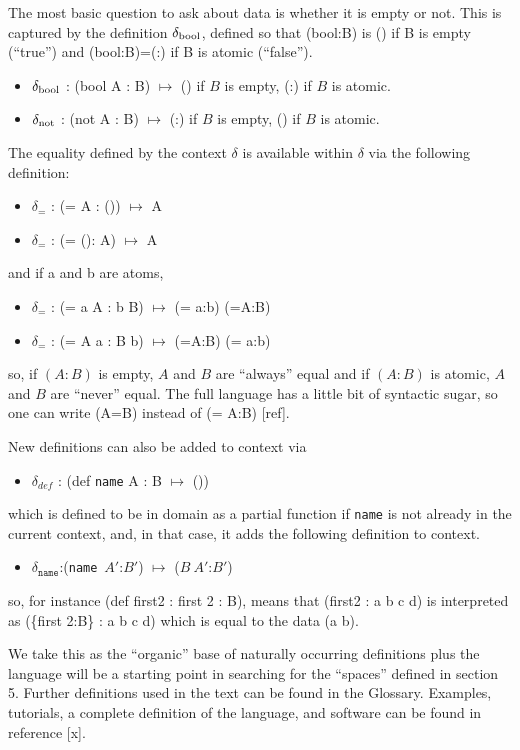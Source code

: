 \documentclass[11pt]{article}
\begin{document}
    The most basic question to ask about data is whether it is empty or not.  This is captured by the definition $\delta_{\rm bool}$, defined 
so that (bool:B) is () if B is empty (``true'') and (bool:B)=(:) if B is atomic (``false'').
\begin{itemize}
\item {$\delta_{\rm bool}$ : ({\rm bool} A : B) $\mapsto$ () if $B$ is empty, (:) if $B$ is atomic.}
\item {$\delta_{\rm not}$ : ({\rm not} A : B) $\mapsto$ (:) if $B$ is empty, () if $B$ is atomic.} 
\end{itemize} 
The equality defined by the context $\delta$ is available within $\delta$ via the following definition:
\begin{itemize}
\item {$\delta_{=}$ : (= A : ()) $\mapsto$ A}
\item {$\delta_{=}$ : (= (): A) $\mapsto$ A}
\end{itemize}
and if a and b are atoms, 
\begin{itemize}
\item {$\delta_{=}$ : (= a A : b B) $\mapsto$ (= a:b) (=A:B)}
\item {$\delta_{=}$ : (= A a : B b) $\mapsto$ (=A:B) (= a:b)}
\end{itemize}
so, if $(A:B)$ is empty, $A$ and $B$ are ``always'' equal and if $(A:B)$ is atomic, $A$ and $B$ are ``never'' equal.  The full language has a little bit 
of syntactic sugar, so one can write (A=B) instead of (= A:B) [ref]. 

New definitions can also be added to context via  
\begin{itemize}
\item {$\delta_{def}$ : ({\rm def} \texttt{name} A : B} $\mapsto$ ())
\end{itemize}
which is defined to be in domain as a partial function if \texttt{name} is not already in the current context, and, in that case, it adds the following definition
to context.
\begin{itemize}
\item {$\delta_{\texttt{name}}$:(\texttt{name}\ $A'$:$B'$) $\mapsto$ ($B\ A'$:$B'$)}
\end{itemize}
so, for instance (def first2 : {first 2 : B}), means that (first2 : a b c d) is interpreted as (\{first 2:B\} : a b c d) which is equal to the data (a b).   

We take this as the ``organic'' base of naturally occurring 
definitions plus the language will be a starting point in searching for the ``spaces'' defined in section 5.  Further definitions used in the text can be found in 
the Glossary.  Examples, tutorials, a complete definition of the language, and software can be 
found in reference [x]. 
\end{document}
